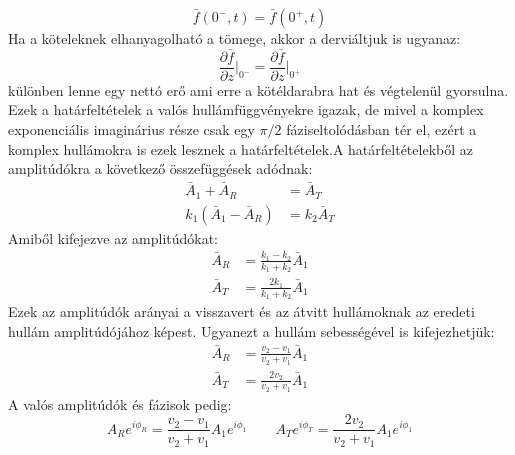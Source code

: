 \documentclass[a4paper,12pt]{article}
\begin{document}
\begin{equation}
    \bar{f}(0^-, t) = \bar{f}(0^+, t)
\end{equation}
Ha a köteleknek elhanyagolható a tömege, akkor a derviáltjuk is ugyanaz:
\begin{equation}
    \frac{\partial \bar{f}}{\partial z} \Big|_{0^-} = \frac{\partial \bar{f}}{\partial z} \Big|_{0^+}
\end{equation}
különben lenne egy nettó erő ami erre a kötéldarabra hat és végtelenül gyorsulna. Ezek a határfeltételek a valós hullámfüggvényekre igazak, de mivel a komplex exponenciális imaginárius része csak egy $\pi/2$ fáziseltolódásban tér el,
ezért a komplex hullámokra is ezek lesznek a határfeltételek.A határfeltételekből az amplitúdókra a következő összefüggések adódnak:
\begin{equation}
    \begin{aligned}
        \bar{A}_1 + \bar{A}_R &= \bar{A}_T \\
        k_1 (\bar{A}_1 - \bar{A}_R) &= k_2 \bar{A}_T
    \end{aligned}
\end{equation}
Amiből kifejezve az amplitúdókat:
\begin{equation}
    \begin{aligned}
        \bar{A}_R &= \frac{k_1 - k_2}{k_1 + k_2} \bar{A}_1 \\
        \bar{A}_T &= \frac{2 k_1}{k_1 + k_2} \bar{A}_1
    \end{aligned}
\end{equation}
Ezek az amplitúdók arányai a visszavert és az átvitt hullámoknak az eredeti hullám amplitúdójához képest. Ugyanezt a hullám sebességével is kifejezhetjük:
\begin{equation}
    \begin{aligned}
        \bar{A}_R &= \frac{v_2 - v_1}{v_2 + v_1} \bar{A}_1 \\
        \bar{A}_T &= \frac{2 v_2}{v_2 + v_1} \bar{A}_1
    \end{aligned}
\end{equation}
A valós amplitúdók és fázisok pedig:
\begin{equation}
    A_R e^{i \phi_R} = \frac{v_2 - v_1}{v_2 + v_1} A_1 e^{i \phi_1} \qquad A_T e^{i \phi_T} = \frac{2 v_2}{v_2 + v_1} A_1 e^{i \phi_1}
\end{equation}
\end{document}
